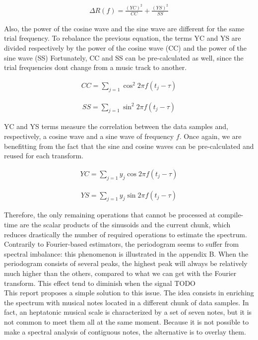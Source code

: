 \documentclass[letterpaper]{article}
\begin{document}
\begin{align}
\Delta R(f) = \frac{(YC)^{2}}{CC} 
+ \frac{(YS)^{2}}{SS}
\label{fig:ccss}
\end{align}

Also, the power of the cosine wave and the sine wave are different for the same trial frequency. To rebalance the previous equation, the terms YC and YS
are divided respectively by the power of the cosine wave (CC) and the power of the sine wave (SS)
Fortunately, CC and SS can be pre-calculated as well, since the trial frequencies don\textquotesingle t change from a music track to another.

\begin{align}
CC = \sum\limits_{j=1} \cos^{2} 2\pi f (t_{j} - \tau)
\label{fig:cc}
\end{align}

\begin{align}
SS = \sum\limits_{j=1} \sin^{2} 2\pi f (t_{j} - \tau)
\label{fig:ss}
\end{align}

YC and YS terms measure the correlation between the data samples and, respectively, a cosine wave and a sine wave of frequency $f$. Once again, we are
benefitting from the fact that the sine and cosine waves can be pre-calculated and reused for each transform.

\begin{align}
YC = \sum\limits_{j=1} y_{j}\cos 2\pi f (t_{j} - \tau)
\end{align}

\begin{align}
YS = \sum\limits_{j=1} y_{j}\sin 2\pi f (t_{j} - \tau)
\end{align}

Therefore, the only remaining operations that cannot be processed at compile-time are the scalar products of the sinusoids and the current chunk, which
reduces drastically the number of required operations to estimate the spectrum.\\

Contrarily to Fourier-based
estimators, the periodogram seems to suffer from spectral imbalance: this phenomenon is illustrated in the appendix B. When the periodogram consists of several peaks, the highest peak will always be relatively much higher than the others, compared to what we can get with the Fourier transform. This effect tend to diminish when the signal TODO \\

This report proposes a simple solution to this issue. The idea consists in enriching the spectrum with musical notes located in a different chunk of data samples. In fact, an heptatonic musical scale is characterized by a set of seven notes, but it is
not common to meet them all at the same moment. Because it is not possible to make a spectral analysis of contiguous notes, the alternative is to overlay them.
\end{document}
